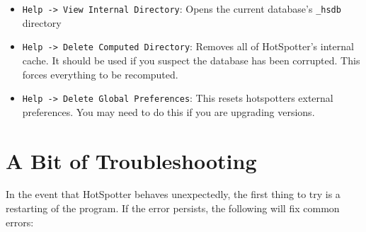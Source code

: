 \documentclass[a4paper,10pt]{article}
\begin{document}
\begin{itemize}
\item \verb+Help -> View Internal Directory+: 
    Opens the current database's {\tt \_hsdb} directory

\item \verb+Help -> Delete Computed Directory+: 
    Removes all of HotSpotter's internal cache. It should be used if you suspect
    the database has been corrupted. This forces everything to be recomputed. 

\item \verb+Help -> Delete Global Preferences+: 
    This resets hotspotters external preferences. You may need to do this if you
    are upgrading versions. 



\end{itemize}
  
\newpage

\section{A Bit of Troubleshooting}

In the event that HotSpotter behaves unexpectedly, the first thing to try is a
restarting of the program. If the error persists, the following will fix common
errors: 
\end{document}
